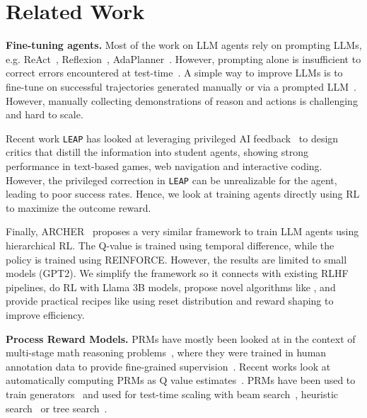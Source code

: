 \section{Related Work}
\vspace{-1em}

\textbf{Fine-tuning agents.} 
Most of the work on LLM agents rely on prompting LLMs, e.g. ReAct~\citep{yao2022react}, Reflexion~\citep{shinn2023reflexion}, AdaPlanner~\citep{sun2024adaplanner}. However, prompting alone is insufficient to correct errors encountered at test-time~\citep{sodhi2024step, liu2023agentbench}. A simple way to improve LLMs is to fine-tune on successful trajectories generated manually or via a prompted LLM~\citep{schick2023toolformer, zeng2023agenttuning, chen2023fireact}. However, manually collecting demonstrations of reason and actions is challenging and hard to scale. 

Recent work \texttt{LEAP} has looked at leveraging privileged AI feedback~\citep{choudhury2024better} to design critics that distill the information into student agents, showing strong performance in text-based games, web navigation and interactive coding. However, the privileged correction in \texttt{LEAP} can be unrealizable for the agent, leading to poor success rates. Hence, we look at training agents directly using RL to maximize the outcome reward. 

Finally, ARCHER~\cite{zhou2024archer} proposes a very similar framework to train LLM agents using hierarchical RL. The Q-value is trained using temporal difference, while the policy is trained using REINFORCE. However, the results are limited to small models (GPT2). We simplify the framework so it connects with existing RLHF pipelines, do RL with Llama 3B models, propose novel algorithms like \inverseprm, and provide practical recipes like using reset distribution and reward shaping to improve efficiency. 

\textbf{Process Reward Models.} 
PRMs have mostly been looked at in the context of multi-stage math reasoning problems~\cite{cobbe2021training}, where they were trained in human annotation data to provide fine-grained supervision~\citep{lightman2023let, uesato2022solving}. Recent works look at automatically computing PRMs as Q value estimates~\citep{luo2024improve, wang2024math}. PRMs have been used to train generators~\citep{shao2024deepseekmath} and used for test-time scaling with beam search~\citep{snell2024scaling}, heuristic search~\cite{ma2023let} or tree search~\citep{wu2024inference}. 

